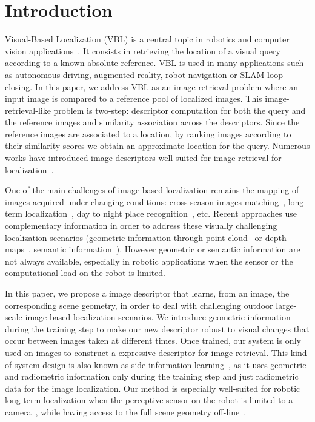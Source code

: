 \section{Introduction}
\label{sec:intro}

Visual-Based Localization (VBL) is a central topic in robotics and computer vision applications~\cite{Piasco2017}. It consists in retrieving the location of a visual query according to a known absolute reference. VBL is used in many applications such as autonomous driving, augmented reality, robot navigation or SLAM loop closing. In this paper, we address VBL as an image retrieval problem where an input image is compared to a reference pool of localized images. This image-retrieval-like problem is two-step: descriptor computation for both the query and the reference images and similarity association across the descriptors. Since the reference images are associated to a location, by ranking images according to their similarity scores we obtain an approximate location for the query. Numerous works have introduced image descriptors well suited for image retrieval for localization~\cite{Arandjelovic2017,Kim2017a,Gordo2017,Radenovic2017,Liu2018}. 

One of the main challenges of image-based localization remains the mapping of images acquired under changing conditions: cross-season images matching~\cite{Naseer2017a}, long-term localization~\cite{Toft2018}, day to night place recognition~\cite{Torii2015}, etc. Recent approaches use complementary information in order to address these visually challenging localization scenarios (geometric information through point cloud~\cite{Sattler2018,Schonberger2018} or depth maps~\cite{Christie2016}, semantic information~\cite{Ardeshir2014,Christie2016,Naseer2017a}). However geometric or semantic information are not always available, especially in robotic applications when the sensor or the computational load on the robot is limited.

In this paper, we propose a image descriptor that learns, from an image, the corresponding scene geometry, in order to deal with challenging outdoor large-scale image-based localization scenarios. We introduce geometric information during the training step to make our new descriptor robust to visual changes that occur between images taken at different times. Once trained, our system is only used on images to construct a expressive descriptor for image retrieval. This kind of system design is also known as side information learning~\cite{Hoffman2016}, as it uses geometric and radiometric information only during the training step and just radiometric data for the image localization. Our method is especially well-suited for robotic long-term localization when the perceptive sensor on the robot is limited to a camera~\cite{Middelberg2014}, while having access to the full scene geometry off-line~\cite{Paparoditis2012,Maddern2016,Wang2016}. 

